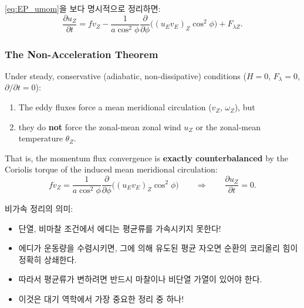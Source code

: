 
\eqref{eq:EP_umom}을 보다 명시적으로 정리하면:
\begin{equation}\label{eq:umom_explicit}
  \frac{\partial u_Z}{\partial t}
  = fv_Z
    - \frac{1}{a\cos^2\phi}\frac{\partial}{\partial\phi}
      \bigl((u_E v_E)_Z\cos^2\phi\bigr)
    + F_{\lambda Z}.
\end{equation}

\subsubsection{The Non-Acceleration Theorem}

\begin{theorem}
Under steady, conservative (adiabatic, non-dissipative) conditions
($H = 0$, $F_\lambda = 0$, $\partial/\partial t = 0$):
\begin{enumerate}
  \item The eddy fluxes force a mean meridional circulation
    ($v_Z$, $\omega_Z$), but
  \item they do \textbf{not} force the zonal-mean zonal wind $u_Z$ or the
    zonal-mean temperature $\theta_Z$.
\end{enumerate}
That is, the momentum flux convergence is \textbf{exactly counterbalanced}
by the Coriolis torque of the induced mean meridional circulation:
\begin{equation}\label{eq:non_accel}
  fv_Z = \frac{1}{a\cos^2\phi}\frac{\partial}{\partial\phi}
    \bigl((u_E v_E)_Z\cos^2\phi\bigr)
  \qquad\Longrightarrow\qquad
  \frac{\partial u_Z}{\partial t} = 0.
\end{equation}
\end{theorem}

\begin{hisublock}
비가속 정리의 의미:
\begin{itemize}
  \item 단열, 비마찰 조건에서 에디는 평균류를 가속시키지 못한다!
  \item 에디가 운동량을 수렴시키면, 그에 의해 유도된 평균 자오면 순환의
    코리올리 힘이 정확히 상쇄한다.
  \item 따라서 평균류가 변하려면 반드시 마찰이나 비단열 가열이 있어야 한다.
  \item 이것은 대기 역학에서 가장 중요한 정리 중 하나!
\end{itemize}
\end{hisublock}


